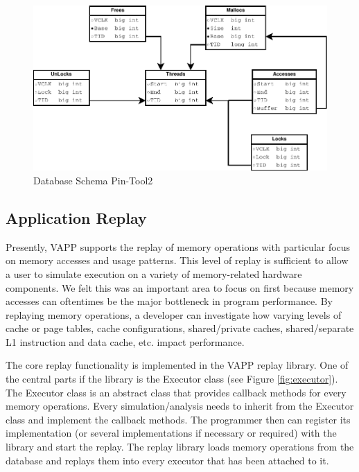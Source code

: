 \begin{figure}
  \includegraphics[width=\columnwidth]{database_schema2}
  \caption{Database Schema Pin-Tool2}
  \label{pic:db_schema2}
\end{figure}


\subsection{Application Replay}
Presently, VAPP supports the replay of memory operations with
particular focus on memory accesses and usage patterns.  This
level of replay is sufficient to allow a user to simulate
execution on a variety of memory-related hardware components.
We felt this was an important area to focus on first because
memory accesses can oftentimes be the major bottleneck in program
performance.  By replaying memory operations, a developer can
investigate how varying levels of cache or page tables, cache 
configurations, shared/private caches, shared/separate L1 instruction
and data cache, etc. impact performance.

The core replay functionality is implemented in the VAPP replay
library. One of the central parts if the library is the Executor class
(see Figure \ref{fig:executor}). The Executor class is an abstract
class that provides callback methods for every memory
operations. Every simulation/analysis needs to inherit from the
Executor class and implement the callback methods. The programmer then
can register its implementation (or several implementations if
necessary or required) with the library and start the replay.  The
replay library loads memory operations from the database and replays
them into every executor that has been attached to it.



